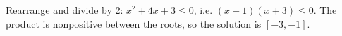 Rearrange and divide by $2$: $x^2+4x+3\le0$, i.e. $(x+1)(x+3)\le0$. The product is nonpositive between the roots, so the solution is $\boxed{[-3,-1]}$.
